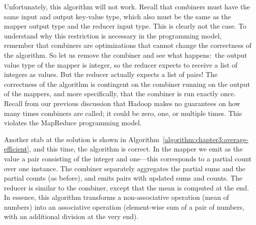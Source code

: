 Unfortunately, this algorithm will not work.  Recall that combiners
must have the same input and output key-value type, which also must be
the same as the mapper output type and the reducer input type.  This
is clearly not the case.  To understand why this restriction is
necessary in the programming model, remember that combiners are
optimizations that cannot change the correctness of the algorithm.  So
let us remove the combiner and see what happens:\ the output value
type of the mapper is integer, so the reducer expects to receive a
list of integers as values.  But the reducer actually expects a list
of pairs!  The correctness of the algorithm is contingent on the
combiner running on the output of the mappers, and more specifically,
that the combiner is run exactly once.  Recall from our previous
discussion that Hadoop makes no guarantees on how many times combiners
are called; it could be zero, one, or multiple times.  This violates
the MapReduce programming model.

Another stab at the solution is shown in
Algorithm~\ref{algorithm:chapter3:average-efficient}, and this time, the
algorithm is correct.  In the mapper we emit as the value a pair
consisting of the integer and one---this corresponds to a partial
count over one instance.  The combiner separately aggregates the
partial sums and the partial counts (as before), and emits pairs with
updated sums and counts.  The reducer is similar to the combiner,
except that the mean is computed at the end.  In essence, this
algorithm transforms a non-associative operation (mean of numbers)
into an associative operation (element-wise sum of a pair of numbers,
with an additional division at the very end).

